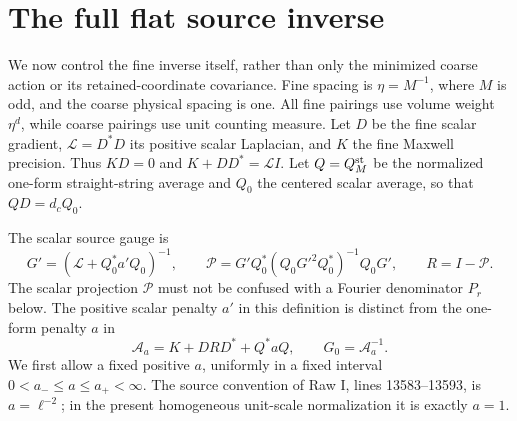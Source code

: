 \section{The full flat source inverse}
\label{inv-section}

We now control the fine inverse itself, rather than only the minimized
coarse action or its retained-coordinate covariance. Fine spacing is
$\eta=M^{-1}$, where $M$ is odd, and the coarse physical spacing is one.
All fine pairings use volume weight $\eta^d$, while coarse pairings use
unit counting measure. Let $D$ be the fine scalar gradient,
$\mathcal L=D^*D$ its positive scalar Laplacian, and $K$ the fine
Maxwell precision. Thus $KD=0$ and $K+DD^*=\mathcal L I$.
Let $Q=Q_M^{\rm st}$ be the normalized one-form straight-string average
and $Q_0$ the centered scalar average, so that $QD=d_cQ_0$.

The scalar source gauge is
\begin{equation}\label{inv-source-projection}
 G'=(\mathcal L+Q_0^*a'Q_0)^{-1},\qquad
 \mathcal P=G'Q_0^*(Q_0G'^2Q_0^*)^{-1}Q_0G',\qquad R=I-\mathcal P.
\end{equation}
The scalar projection $\mathcal P$ must not be confused with a Fourier
denominator $P_r$ below. The positive scalar penalty $a'$ in this
definition is distinct from the one-form penalty $a$ in
\begin{equation}\label{inv-fine-precision}
 \mathcal A_a=K+DRD^*+Q^*aQ,\qquad G_0=\mathcal A_a^{-1}.
\end{equation}
We first allow a fixed positive $a$, uniformly in a fixed interval
$0<a_-\le a\le a_+<\infty$. The source convention of Raw I,
lines 13583--13593, is $a=\ell^{-2}$; in the present homogeneous
unit-scale normalization it is exactly $a=1$.

